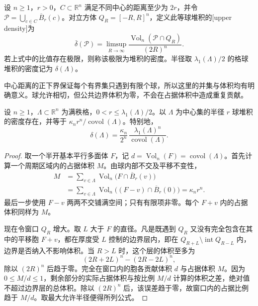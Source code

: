 \begin{definition}
	\label{g1:def:sphere-packing-upper-density}
	设 \(n\ge1\)，\(r>0\)，\(C\subset\mathbb R^n\) 满足不同中心的距离至少为 \(2r\)，并令 \(\mathcal P=\bigcup_{c\in C}\overline B_r(c)\)。对立方体 \(Q_R=[-R,R]^n\)，定义此等球堆积的[upper density]为
	\[
		\overline\delta(\mathcal P)
		=\limsup_{R\to\infty}\frac{\operatorname{Vol}_n(\mathcal P\cap Q_R)}{(2R)^n}.
	\]
	若上式中的比值存在极限，则称该极限为堆积的密度。半径取 \(\lambda_1(\Lambda)/2\) 的格球堆积的密度记为 \(\delta(\Lambda)\)。
\end{definition}


中心距离的正下界保证每个有界集只遇到有限个球，所以这里的并集与体积均有明确意义。球允许相切，但公共边界体积为零，不会在占据体积中造成重复贡献。

\begin{theorem}
	\label{g1:thm:lattice-packing-density}
	设 \(n\ge1\)，\(\Lambda\subset\mathbb R^n\) 为满秩格，\(0<r\le\lambda_1(\Lambda)/2\)。以 \(\Lambda\) 为中心集的半径 \(r\) 球堆积的密度存在，并等于 \(\kappa_n r^n/\operatorname{covol}(\Lambda)\)。特别地，
	\begin{equation}\label{g1:eq:lattice-packing-density}
		\delta(\Lambda)=\frac{\kappa_n}{2^n}\,
		\frac{\lambda_1(\Lambda)^n}{\operatorname{covol}(\Lambda)}.
	\end{equation}
\end{theorem}
\begin{proof}
	取一个半开基本平行多面体 \(F\)，记 \(d=\operatorname{Vol}_n(F)=\operatorname{covol}(\Lambda)\)。首先计算一个周期区域内的占据体积 \(M\)。由球内部不交及平移不变性，
	\begin{align*}
		M&=\sum_{v\in\Lambda}\operatorname{Vol}_n\bigl(F\cap\overline B_r(v)\bigr)\\
		&=\sum_{v\in\Lambda}\operatorname{Vol}_n\bigl((F-v)\cap\overline B_r(0)\bigr)
		=\kappa_n r^n.
	\end{align*}
	最后一步使用 \(F-v\) 两两不交铺满空间；只有有限项非零。每个 \(F+v\) 内的占据体积同样为 \(M\)。

	现在令窗口 \(Q_R\) 增大。取 \(L\) 大于 \(F\) 的直径。凡是既遇到 \(Q_R\) 又没有完全包含在其中的平移胞 \(F+v\)，都在厚度受 \(L\) 控制的边界层内，即在 \(Q_{R+L}\setminus\operatorname{int}Q_{R-L}\) 内，边界是否纳入不影响体积。当 \(R>L\) 时，这个层的体积至多为
	\[
		(2R+2L)^n-(2R-2L)^n,
	\]
	除以 \((2R)^n\) 后趋于零。完全在窗口内的胞各贡献体积 \(d\) 与占据体积 \(M\)。因为 \(0\le M/d\le1\)，剩余部分的实际占据体积与按比例 \(M/d\) 计算的体积之差，绝对值不超过边界层的总体积。除以 \((2R)^n\) 后，该误差趋于零，故窗口内的占据比例趋于 \(M/d\)。取最大允许半径便得所列公式。
\end{proof}

